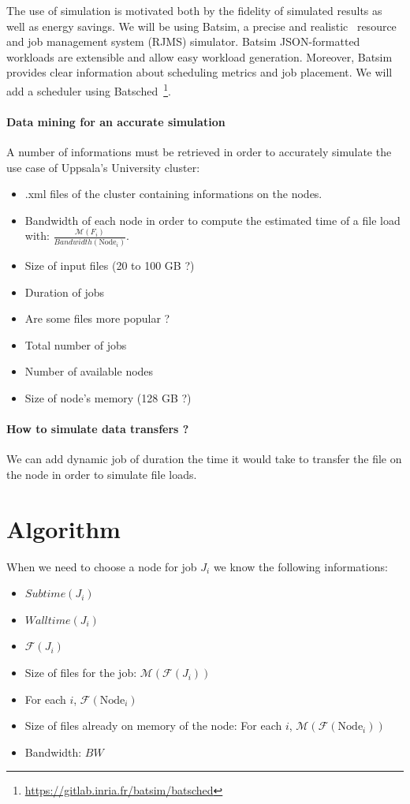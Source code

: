 \documentclass[a4paper]{article}
\newcommand{\Node}[1]{\ensuremath{\mathrm{Node}_{#1}}\xspace}
\newcommand{\inputs}{\ensuremath{\mathcal{F}}\xspace}
\newcommand{\memory}{\ensuremath{\mathcal{M}}\xspace}
\newcommand{\bandwidth}{\mathit{BW}\xspace}
\newcommand{\submissiontime}{\mathit{Subtime}\xspace}
\newcommand{\walltime}{\mathit{Walltime}\xspace}
\begin{document}
The use of simulation is motivated both by the fidelity of simulated results as well as energy savings. 
We will be using Batsim, a precise and realistic~\cite{Batsim} resource and job management system (RJMS) simulator.
Batsim JSON-formatted workloads are extensible and allow easy workload generation. 
Moreover, Batsim provides clear information about scheduling metrics and job placement.
We will add a scheduler using Batsched~\footnote{\url{https://gitlab.inria.fr/batsim/batsched}}.

\paragraph{Data mining for an accurate simulation}
A number of informations must be retrieved in order to accurately 
simulate the use case of Uppsala's University cluster:
\begin{itemize}
	\item	.xml files of the cluster containing informations on the nodes.
	\item	Bandwidth of each node in order to compute the estimated time of a file load with: $\frac{\memory(F_i)}{\mathit{Bandwidth(\Node{i})}}$.
	\item	Size of input files (20 to 100 GB ?)
	\item	Duration of jobs
	\item	Are some files more popular ?
	\item	Total number of jobs
	\item	Number of available nodes
	\item	Size of node's memory (128 GB ?)
\end{itemize}

\paragraph{How to simulate data transfers ?}
We can add dynamic job of duration the time it would take to transfer the file on the node in order
to simulate file loads.

\section{Algorithm}

When we need to choose a node for job $J_i$ we know the following informations:
\begin{itemize}
	\item $\submissiontime(J_i)$
	\item $\walltime(J_i)$
	\item $\inputs(J_i)$
	\item Size of files for the job: $\memory(\inputs(J_i))$
	\item For each $i$, $\inputs(\Node{i})$
	\item Size of files already on memory of the node: For each $i$, $\memory(\inputs(\Node{i}))$
	\item Bandwidth: $\bandwidth$
\end{itemize}
\end{document}
